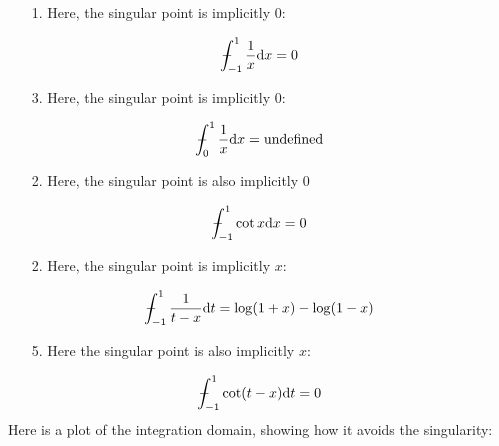 \documentclass[12pt,a4paper]{article}
\def\D{ {\rm d} }
\def\Xint#1{ \mathchoice
   {\XXint\displaystyle\textstyle{#1} }%
   {\XXint\textstyle\scriptstyle{#1} }%
   {\XXint\scriptstyle\scriptscriptstyle{#1} }%
   {\XXint\scriptscriptstyle\scriptscriptstyle{#1} }%
   \!\int}
\def\XXint#1#2#3{ {\setbox0=\hbox{$#1{#2#3}{\int}$}
     \vcenter{\hbox{$#2#3$}}\kern-.5\wd0} }
\def\dashint{\Xint-}
\def\dx{\D x}
\def\dt{\D t}
\begin{document}
\begin{itemize}
\item[1. ] Here, the singular point is implicitly 0:

\end{itemize}
\[
\dashint_{-1}^1  {1 \over x} \dx = 0
\]
\begin{itemize}
\item[3. ] Here, the singular point is implicitly 0:

\end{itemize}
\[
\dashint_0^1  {1 \over x} \dx = \hbox{undefined}
\]
\begin{itemize}
\item[2. ] Here, the singular point is also implicitly 0

\end{itemize}
\[
\dashint_{-1}^1  \cot x \dx = 0
\]
\begin{itemize}
\item[2. ] Here, the singular point is implicitly $x$:

\end{itemize}
\[
\dashint_{-1}^1  {1 \over t - x} \D t = \log(1+x) - \log(1-x)
\]
\begin{itemize}
\item[5. ] Here the singular point is also implicitly $x$:

\end{itemize}
\[
\dashint_{-1}^1  \cot(t-x) \dt = 0
\]
Here is a plot of the integration domain, showing how it avoids the singularity:
\end{document}
